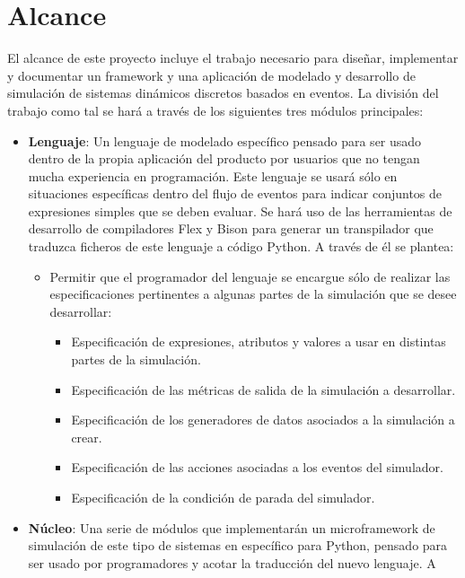 \section{Alcance}\label{sec:alcance}

El alcance de este proyecto incluye el trabajo necesario para diseñar,
implementar y documentar un framework y una aplicación de modelado y desarrollo
de simulación de sistemas dinámicos discretos basados en eventos. La división
del trabajo como tal se hará a través de los siguientes tres módulos principales:
\begin{itemize}
    \item \textbf{Lenguaje}: Un lenguaje de modelado específico pensado para ser
    usado dentro de la propia aplicación del producto por usuarios que no tengan
    mucha experiencia en programación. Este lenguaje se usará sólo en
    situaciones específicas dentro del flujo de eventos para indicar conjuntos
    de expresiones simples que se deben evaluar. Se hará uso de las herramientas
    de desarrollo de compiladores Flex y Bison para generar un transpilador que
    traduzca ficheros de este lenguaje a código Python. A través de él se
    plantea:
    \begin{itemize}
        \item Permitir que el programador del lenguaje se encargue sólo de
        realizar las especificaciones pertinentes a algunas partes de la
        simulación que se desee desarrollar:
        \begin{itemize}
            \item Especificación de expresiones, atributos y valores a usar
            en distintas partes de la simulación.
            \item Especificación de las métricas de salida de la simulación a
            desarrollar.
            \item Especificación de los generadores de datos asociados a la
            simulación a crear.
            \item Especificación de las acciones asociadas a los eventos del
            simulador.
            \item Especificación de la condición de parada del simulador.
        \end{itemize}
    \end{itemize}
    \item \textbf{Núcleo}: Una serie de módulos que implementarán un microframework de
    simulación de este tipo de sistemas en específico para Python, pensado para
    ser usado por programadores y acotar la traducción del nuevo lenguaje. A

\end{itemize}
